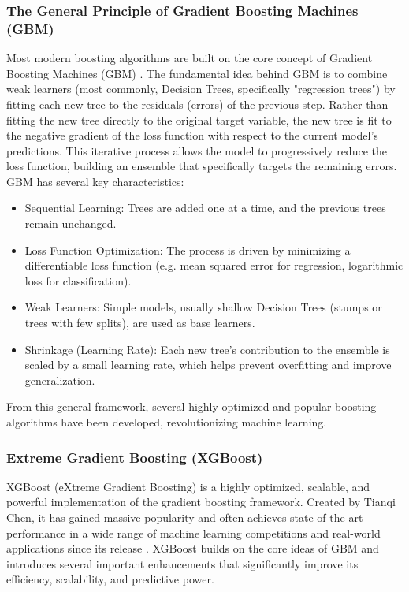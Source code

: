 \subsubsection{The General Principle of Gradient Boosting Machines (GBM)}
Most modern boosting algorithms are built on the core concept of Gradient Boosting Machines (GBM) \parencite{chen2016xgboost}. The fundamental idea behind GBM is to combine weak learners (most commonly, Decision Trees, specifically "regression trees") by fitting each new tree to the residuals (errors) of the previous step. Rather than fitting the new tree directly to the original target variable, the new tree is fit to the negative gradient of the loss function with respect to the current model's predictions. This iterative process allows the model to progressively reduce the loss function, building an ensemble that specifically targets the remaining errors. GBM has several key characteristics: 
\begin{itemize}[noitemsep] 
\item Sequential Learning: Trees are added one at a time, and the previous trees remain unchanged.
\item Loss Function Optimization: The process is driven by minimizing a differentiable loss function (e.g. mean squared error for regression, logarithmic loss for classification).
\item Weak Learners: Simple models, usually shallow Decision Trees (stumps or trees with few splits), are used as base learners.
\item Shrinkage (Learning Rate): Each new tree's contribution to the ensemble is scaled by a small learning rate, which helps prevent overfitting and improve generalization.
\end{itemize} 
From this general framework, several highly optimized and popular boosting algorithms have been developed, revolutionizing machine learning.

\subsubsection{Extreme Gradient Boosting (XGBoost)} 
XGBoost (eXtreme Gradient Boosting) is a highly optimized, scalable, and powerful implementation of the gradient boosting framework. Created by Tianqi Chen, it has gained massive popularity and often achieves state-of-the-art performance in a wide range of machine learning competitions and real-world applications since its release \parencite{chen2016xgboost}. XGBoost builds on the core ideas of GBM and introduces several important enhancements that significantly improve its efficiency, scalability, and predictive power.

